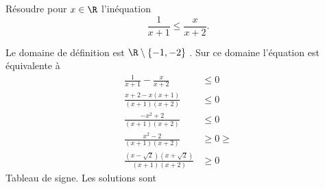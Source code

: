



\begin{exercice}
Résoudre pour $x \in \R$ l'inéquation $$\frac{1}{x+1}\leq \frac{x}{x+2}.$$
\end{exercice}



\begin{correction}
Le domaine de définition est $\R\setminus\{ -1, -2\}$ . Sur ce domaine l'équation est équivalente à 
\begin{align*}
\frac{1}{x+1}-\frac{x}{x+2}&\leq 0\\
\frac{x+2-x(x+1)}{(x+1)(x+2)}&\leq 0\\
\frac{-x^2+2}{(x+1)(x+2)}&\leq 0\\
\frac{x^2-2}{(x+1)(x+2)}&\geq 0\geq\\
\frac{(x-\sqrt{2})(x+\sqrt{2})}{(x+1)(x+2)}&\geq 0
\end{align*}
Tableau de signe. 
Les solutions sont 
\begin{center}
\fbox{$\cS =]-\infty, -2[\cup [-\sqrt{2}, -1[\cup [\sqrt{2}, +\infty[$. }
\end{center}


\end{correction}